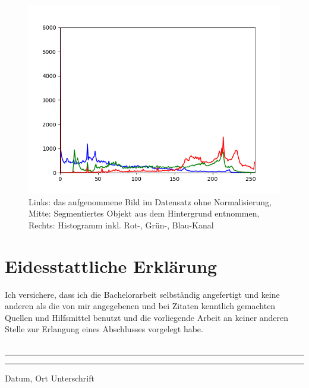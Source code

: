 \documentclass[a4paper,12pt,oneside]{article}
\begin{document}
\begin{figure}[htb]
\begin{minipage}[c]{0.08\textwidth}
\end{minipage}
\hfill
\begin{minipage}[c]{0.3\textwidth}
\includegraphics[width=\textwidth]{Sources/Bild3_HA_histo.png}
\end{minipage}
\label{img:evalHA}
\caption{Links: das aufgenommene Bild im Datensatz ohne Normalisierung, Mitte: Segmentiertes Objekt aus dem Hintergrund entnommen, Rechts: Histogramm inkl. Rot-, Grün-, Blau-Kanal}
\end{figure}
  \newpage
  \section*{Eidesstattliche Erklärung}
Ich versichere, dass ich die Bachelorarbeit selbständig angefertigt und keine anderen als die von mir angegebenen und bei Zitaten kenntlich gemachten Quellen und Hilfsmittel benutzt und die vorliegende Arbeit an keiner anderen Stelle zur Erlangung eines Abschlusses vorgelegt habe.\\\\
 

\vspace{50pt} 
\noindent\rule{5cm}{.4pt}\hfill\rule{5cm}{.4pt}\par 
\noindent Datum, Ort \hfill Unterschrift 
\end{document}
